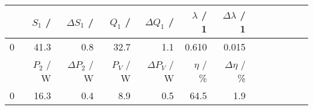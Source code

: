 \begin{tabular}{lrrrrrrrrrrrr}
	\toprule
	{} & $S_1$ / \si{\va}   & $\Delta S_1$ / \si{\va}   & $Q_1$ / \si{\var}  & $\Delta Q_1$ / \si{\var}  & $\lambda$ / 1          & $\Delta \lambda$ / 1          \\
	\midrule
	0  & 41.3               & 0.8                       & 32.7               & 1.1                       & 0.610                  & 0.015                         \\
	\bottomrule
	\toprule
	{} & $P_2$ / \si{\watt} & $\Delta P_2$ / \si{\watt} & $P_V$ / \si{\watt} & $\Delta P_V$ / \si{\watt} & $\eta$ / \si{\percent} & $\Delta \eta$ / \si{\percent} \\
	\midrule
	0  & 16.3               & 0.4                       & 8.9                & 0.5                       & 64.5                   & 1.9                           \\
	\bottomrule
\end{tabular}
